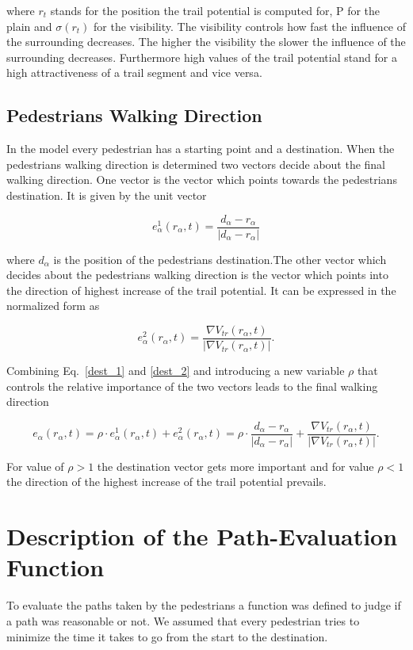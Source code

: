 where $r_t$ stands for the position the trail potential is computed for, P for the plain and $\sigma(r_t)$ for the visibility. The visibility controls how fast the influence of the surrounding decreases. The higher the visibility the slower the influence of the surrounding decreases. Furthermore high values of the trail potential stand for a high attractiveness of a trail segment and vice versa. 

\subsection{Pedestrians Walking Direction}
\label{pedestrians_direction}

In the model every pedestrian has a starting point and a destination. When the pedestrians walking direction is determined two vectors decide about the final walking direction. One vector is the vector which points towards the pedestrians destination. It is given by the unit vector

\begin{equation}
\label{dest_1}
e_{\alpha}^{1}(r_{\alpha},t)=\frac{d_{\alpha}-r_{\alpha}}{|d_{\alpha}-r_{\alpha}|}
\end{equation}

where $d_{\alpha}$ is the position of the pedestrians destination.The other vector which decides about the pedestrians walking direction is the vector which points into the direction of highest increase of the trail potential. It can be expressed in the normalized form as

\begin{equation}
\label{dest_2}
e_{\alpha}^{2}(r_{\alpha},t)=\frac{\nabla{V_{tr}(r_{\alpha},t)}}{|\nabla{V_{tr}(r_{\alpha},t)}|}.
\end{equation}

Combining Eq.\ \ref{dest_1} and \ref{dest_2} and introducing a new variable $\rho$ that controls the relative importance of the two vectors leads to the final walking direction

\begin{equation}
e_{\alpha}(r_{\alpha},t)=\rho \cdot e_{\alpha}^{1}(r_{\alpha},t)+e_{\alpha}^{2}(r_{\alpha},t)=\rho \cdot \frac{d_{\alpha}-r_{\alpha}}{|d_{\alpha}-r_{\alpha}|}+\frac{\nabla{V_{tr}(r_{\alpha},t)}}{|\nabla{V_{tr}(r_{\alpha},t)}|}.
\end{equation}

For value of $\rho>1$ the destination vector gets more important and for value $\rho<1$ the direction of the highest increase of the trail potential prevails.

\section{Description of the Path-Evaluation Function}

To evaluate the paths taken by the pedestrians a function was defined to judge if a path was reasonable or not. We assumed that every pedestrian tries to minimize the time it takes to go from the start to the destination. \citet{koelbl_helbing:2003}